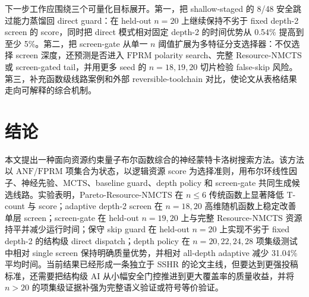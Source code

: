 \documentclass[UTF8,fontset=macnew,11pt]{ctexart}
\newcommand{\method}{Resource-NMCTS}
\newcommand{\pareto}{Pareto-Resource-NMCTS}
\newcommand{\anf}{\ensuremath{\mathrm{ANF}}}
\newcommand{\fprm}{\ensuremath{\mathrm{FPRM}}}
\newcommand{\mcts}{\ensuremath{\mathrm{MCTS}}}
\begin{document}
下一步工作应围绕三个可量化目标展开。第一，把 shallow-staged 的 8/48 安全跳过能力蒸馏回 direct guard：在 held-out $n=20$ 上继续保持不劣于 fixed depth-2 screen 的 score，同时把 direct 模式相对固定 depth-2 的时间优势从 0.54\% 提高到至少 5\%。第二，把 screen-gate 从单一 $n$ 阈值扩展为多特征分支选择器：不仅选择 screen 深度，还预测是否进入 \fprm{} polarity search、完整 \method{} 或 screen-gated tail，并用更多 seed 的 $n=18,19,20$ 切片检验 false-skip 风险。第三，补充函数级线路案例和外部 reversible-toolchain 对比，使论文从表格结果走向可解释的综合机制。

\section{结论}

本文提出一种面向资源约束量子布尔函数综合的神经蒙特卡洛树搜索方法。该方法以 \anf{}/\fprm{} 项集合为状态，以逻辑资源 score 为选择准则，用布尔环线性因子、神经先验、\mcts{}、baseline guard、depth policy 和 screen-gate 共同生成候选线路。实验表明，\pareto{} 在 $n\leq6$ 传统函数上显著降低 T-count 与 score；adaptive depth-2 screen 在 $n=18,20$ 高维随机函数上稳定改善单层 screen；screen-gate 在 held-out $n=19,20$ 上与完整 \method{} 资源持平并减少运行时间；保守 skip guard 在 held-out $n=20$ 上实现不劣于 fixed depth-2 的结构级 direct dispatch；depth policy 在 $n=20,22,24,28$ 项集级测试中相对 single screen 保持明确质量优势，并相对 all-depth adaptive 减少 31.04\% 平均时间。当前结果已经形成一条独立于 SSHR 的论文主线，但要达到更强投稿标准，还需要把结构级 AI 从小幅安全门控推进到更大覆盖率的质量收益，并将 $n>20$ 的项集级证据补强为完整语义验证或符号等价验证。
\end{document}
